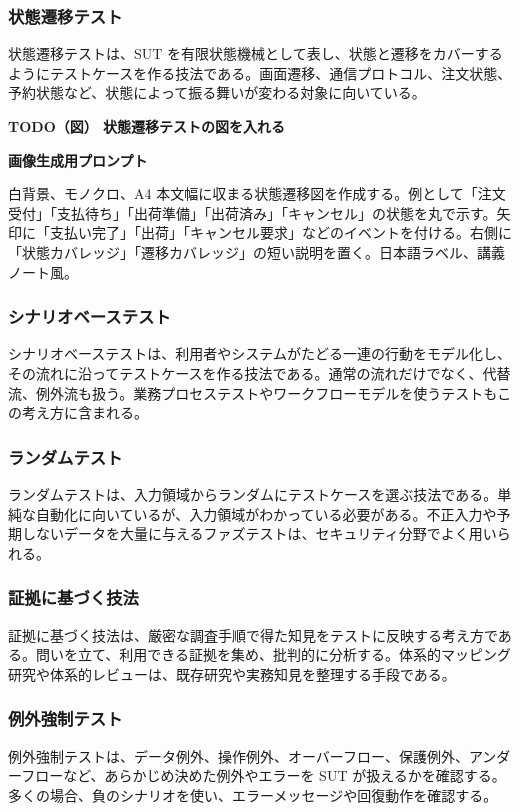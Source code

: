 \documentclass[uplatex,dvipdfmx,a4paper,11pt,nomag]{jsarticle}
\newenvironment{todobox}[2]{\par\medskip\begin{framed}\noindent\textbf{TODO（図） #1}\par\smallskip\noindent\textbf{画像生成用プロンプト}\par\smallskip\noindent #2\par\smallskip}{\end{framed}\par\medskip}
\begin{document}
\subsubsection{状態遷移テスト}
状態遷移テストは、SUT を有限状態機械として表し、状態と遷移をカバーするようにテストケースを作る技法である。画面遷移、通信プロトコル、注文状態、予約状態など、状態によって振る舞いが変わる対象に向いている。

\begin{todobox}{状態遷移テストの図を入れる}{白背景、モノクロ、A4 本文幅に収まる状態遷移図を作成する。例として「注文受付」「支払待ち」「出荷準備」「出荷済み」「キャンセル」の状態を丸で示す。矢印に「支払い完了」「出荷」「キャンセル要求」などのイベントを付ける。右側に「状態カバレッジ」「遷移カバレッジ」の短い説明を置く。日本語ラベル、講義ノート風。}
\end{todobox}

\subsubsection{シナリオベーステスト}
シナリオベーステストは、利用者やシステムがたどる一連の行動をモデル化し、その流れに沿ってテストケースを作る技法である。通常の流れだけでなく、代替流、例外流も扱う。業務プロセステストやワークフローモデルを使うテストもこの考え方に含まれる。

\subsubsection{ランダムテスト}
ランダムテストは、入力領域からランダムにテストケースを選ぶ技法である。単純な自動化に向いているが、入力領域がわかっている必要がある。不正入力や予期しないデータを大量に与えるファズテストは、セキュリティ分野でよく用いられる。

\subsubsection{証拠に基づく技法}
証拠に基づく技法は、厳密な調査手順で得た知見をテストに反映する考え方である。問いを立て、利用できる証拠を集め、批判的に分析する。体系的マッピング研究や体系的レビューは、既存研究や実務知見を整理する手段である。

\subsubsection{例外強制テスト}
例外強制テストは、データ例外、操作例外、オーバーフロー、保護例外、アンダーフローなど、あらかじめ決めた例外やエラーを SUT が扱えるかを確認する。多くの場合、負のシナリオを使い、エラーメッセージや回復動作を確認する。
\end{document}

